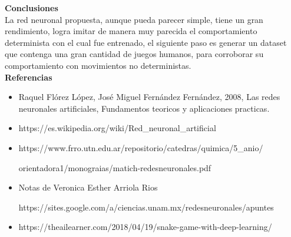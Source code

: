 \documentclass[12pt]{article}
\begin{document}
    {\bf Conclusiones}\\
    
    La red neuronal propuesta, aunque pueda parecer simple, tiene un gran rendimiento, logra imitar de manera muy parecida el comportamiento determinista con el cual fue entrenado, el siguiente paso es generar un dataset que contenga una gran cantidad de juegos humanos, para corroborar su comportamiento con movimientos no deterministas.\\
        
    {\bf Referencias }
    \begin{itemize}
        \item Raquel Flórez López, José Miguel Fernández Fernández, 2008, Las redes neuronales artificiales, Fundamentos teoricos y aplicaciones practicas.
        \item https://es.wikipedia.org/wiki/Red\_neuronal\_artificial
        \item https://www.frro.utn.edu.ar/repositorio/catedras/quimica/5\_anio/
        
        orientadora1/monograias/matich-redesneuronales.pdf
        
        \item Notas de Veronica Esther Arriola Rios
        
        https://sites.google.com/a/ciencias.unam.mx/redesneuronales/apuntes
        
        \item https://theailearner.com/2018/04/19/snake-game-with-deep-learning/
        
    \end{itemize}{}    
    
\end{document}

